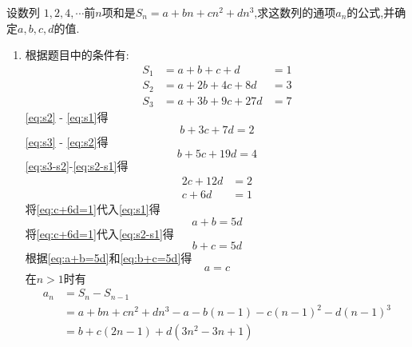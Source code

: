 \begin{questions}
	\question 设数列 $1,2,4, \cdots$前$n$项和是$S_n = a + bn + cn^2 +
		dn^3$,求这数列的通项$a_n$的公式,并确定$a,b,c,d$的值.
	\begin{solution}
		\begin{enumerate}[label=\protect\circled{\arabic*}]
			\item 根据题目中的条件有:
			      \begin{align}
				      S_1 & = a + b + c + d     & = 1\label{eq:s1} \\
				      S_2 & = a + 2b + 4c + 8d  & = 3\label{eq:s2} \\
				      S_3 & = a + 3b + 9c + 27d & = 7\label{eq:s3}
			      \end{align}
			      \eqref{eq:s2} - \eqref{eq:s1}得
			      \begin{equation}
				      b + 3c + 7d =2 \label{eq:s2-s1}
			      \end{equation}
			      \eqref{eq:s3} - \eqref{eq:s2}得
			      \begin{equation}
				      b + 5c + 19d = 4
				      \label{eq:s3-s2}
			      \end{equation}
			      \eqref{eq:s3-s2}-\eqref{eq:s2-s1}得
			      \begin{align}
				      2c + 12d & = 2 \nonumber \\
				      c + 6d   & = 1
				      \label{eq:c+6d=1}
			      \end{align}
			      将\eqref{eq:c+6d=1}代入\eqref{eq:s1}得
			      \begin{equation}
				      a+b = 5d
				      \label{eq:a+b=5d}
			      \end{equation}
			      将\eqref{eq:c+6d=1}代入\eqref{eq:s2-s1}得
			      \begin{equation}
				      b+c = 5d
				      \label{eq:b+c=5d}
			      \end{equation}
			      根据\eqref{eq:a+b=5d}和\eqref{eq:b+c=5d}得
			      \begin{equation}
				      a = c
				      \label{eq:a=c}
			      \end{equation}
			      在$n>1$时有
			      \begin{align}
				      a_n & = S_n - S_{n-1} \nonumber                                           \\
				          & = a + bn + cn^2 + dn^3 - a - b(n-1) - c(n-1)^2 - d(n-1)^3 \nonumber \\
				          & = b + c(2n-1) + d(3n^2 - 3n + 1)
				      \label{eq:an}
			      \end{align}

\end{enumerate}
\end{solution}
\end{questions}
